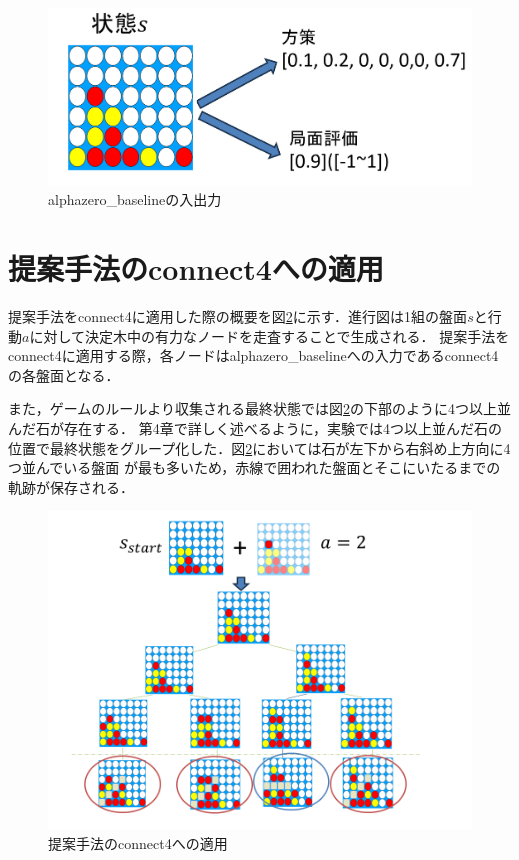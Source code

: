 \begin{figure}[htbp]
    \centering
    \includegraphics[trim={0cm 0cm 0cm 0cm},clip]{./figure/baseline.png}

    \caption{alphazero\_baselineの入出力}
    \label{fig:baseline}
\end{figure}
\section{提案手法のconnect4への適用}
提案手法をconnect4に適用した際の概要を図\ref{fig:application}に示す．進行図は1組の盤面$s$と行動$a$に対して決定木中の有力なノードを走査することで生成される．
提案手法をconnect4に適用する際，各ノードはalphazero\_baselineへの入力であるconnect4の各盤面となる．

また，ゲームのルールより収集される最終状態では図\ref{fig:application}の下部のように4つ以上並んだ石が存在する．
第4章で詳しく述べるように，実験では4つ以上並んだ石の位置で最終状態をグループ化した．図\ref{fig:application}においては石が左下から右斜め上方向に4つ並んでいる盤面
が最も多いため，赤線で囲われた盤面とそこにいたるまでの軌跡が保存される．
\begin{figure}[htbp]
	\centering
	\includegraphics[width=\linewidth]{./figure/application.png}
	\caption{提案手法のconnect4への適用}
	\label{fig:application}
\end{figure}

